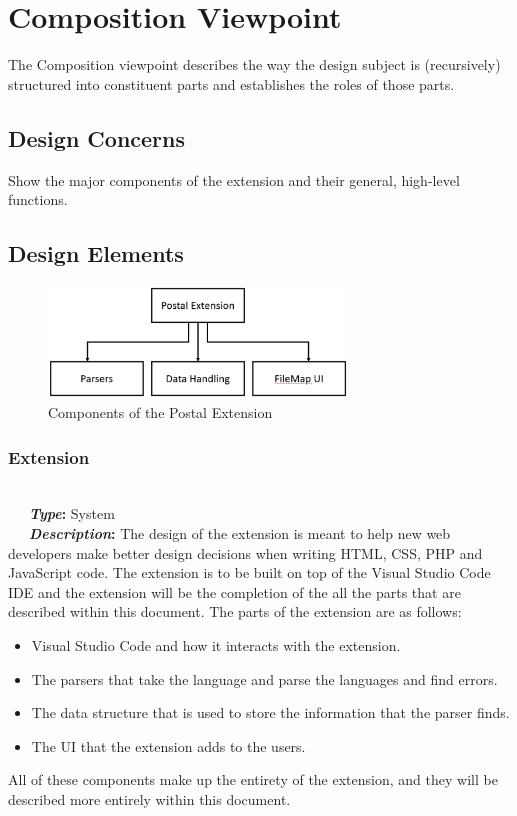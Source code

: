 \documentclass[letterpaper,10pt,titlepage,draftclsnofoot,onecolumn,onesided] {IEEEtran}
\newcommand{\bolditin}[2]{
	\-\ \-\ \-\ \textbf{\textit{#1}#2}
}
\begin{document}
\section{Composition Viewpoint}
The Composition viewpoint describes the way the design subject is (recursively) structured into constituent
parts and establishes the roles of those parts. 
\subsection{Design Concerns}
Show the major components of the extension and their general, high-level functions.
\subsection{Design Elements}
\begin{figure}[h!]
	\includegraphics[width=300px]{CompositionUMLEPS.eps}
	\caption{Components of the Postal Extension}
\end{figure}

\subsubsection{Extension}
\hfill \\
\bolditin{Type}{:} System \\
\bolditin{Description}{:}  The design of the extension is meant to help new web developers make better design decisions when writing HTML, CSS, PHP and JavaScript code.
The extension is to be built on top of the Visual Studio Code IDE and the extension will be the completion of the all the parts that are described within this document. 
The parts of the extension are as follows:
\begin{itemize}
	\item Visual Studio Code and how it interacts with the extension.
	\item The parsers that take the language and parse the languages and find errors.
	\item The data structure that is used to store the information that the parser finds.
	\item The UI that the extension adds to the users. 
\end{itemize}
All of these components make up the entirety of the extension, and they will be described more entirely within this document. 
	
\end{document}
